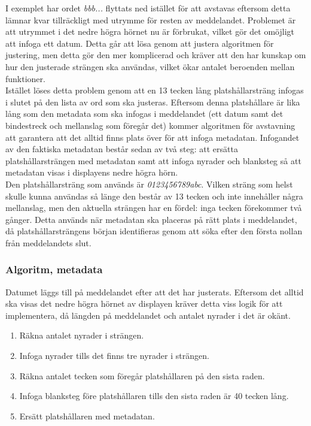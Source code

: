\documentclass[a4paper,11pt]{article}
\begin{document}
I exemplet har ordet {\it bbb...} flyttats ned istället för att avstavas eftersom detta lämnar kvar tillräckligt med utrymme för resten av meddelandet. Problemet är att utrymmet i det nedre högra hörnet nu är förbrukat, vilket gör det omöjligt att infoga ett datum. Detta går att lösa genom att justera algoritmen för justering, men detta gör den mer komplicerad och kräver att den har kunskap om hur den justerade strängen ska användas, vilket ökar antalet beroenden mellan funktioner. \\

Istället löses detta problem genom att en 13 tecken lång platshållarsträng infogas i slutet på den lista av ord som ska justeras. Eftersom denna platshållare är lika lång som den metadata som ska infogas i meddelandet (ett datum samt det bindestreck och mellanslag som föregår det) kommer algoritmen för avstavning att garantera att det alltid finns plats över för att infoga metadatan. Infogandet av den faktiska metadatan består sedan av två steg: att ersätta platshållarsträngen med metadatan samt att infoga nyrader och blanksteg så att metadatan visas i displayens nedre högra hörn. \\

Den platshållarsträng som används är {\it 0123456789abc}. Vilken sträng som helst skulle kunna användas så länge den består av 13 tecken och inte innehåller några mellanslag, men den aktuella strängen har en fördel: inga tecken förekommer två gånger. Detta används när metadatan ska placeras på rätt plats i meddelandet, då platshållarsträngens början identifieras genom att söka efter den första nollan från meddelandets slut. 

\subsubsection{Algoritm, metadata}
Datumet läggs till på meddelandet efter att det har justerats. Eftersom det alltid ska visas det nedre högra hörnet av displayen kräver detta viss logik för att implementera, då längden på meddelandet och antalet nyrader i det är okänt.
	\begin{enumerate}
    	\item Räkna antalet nyrader i strängen.
    	\item Infoga nyrader tills det finns tre nyrader i strängen.
    	\item Räkna antalet tecken som föregår platshållaren på den sista raden.
    	\item Infoga blanksteg före platshållaren tills den sista raden är 40 tecken lång.	
    	\item Ersätt platshållaren med metadatan.
    	\end{enumerate}
    	
\end{document}
